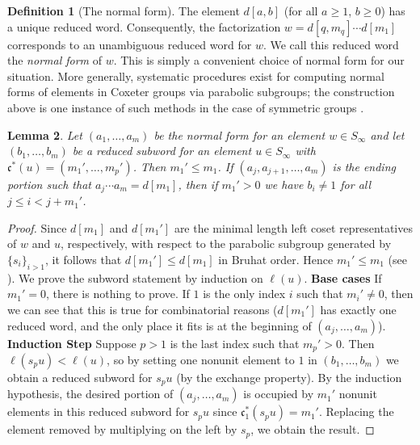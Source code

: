 \documentclass[reqno]{amsart}
\newtheorem{lemma}{Lemma}[subsection]
\theoremstyle{definition}
\newtheorem{definition}[lemma]{Definition}
\theoremstyle{remark}
\numberwithin{equation}{subsection}
\newcommand{\code}{\mathfrak{c}}
\begin{document}
\begin{definition}[The normal form]
The element $d[a,b]$ (for all $a\geq 1$, $b\geq 0$) has a unique reduced word. Consequently, the factorization $w=d[q,m_q]\cdots d[m_1]$ corresponds to an unambiguous reduced word for $w$. We call this reduced word the \emph{normal form} of $w$. This is simply a convenient choice of normal form for our situation. More generally, systematic procedures exist for computing normal forms of elements in Coxeter groups via parabolic subgroups; the construction above is one instance of such methods in the case of symmetric groups \cite{combcox}.
\end{definition}

\begin{lemma} \label{lemma:subword}
Let $(a_1,\ldots,a_m)$ be the normal form for an element $w\in S_\infty$ and let $(b_1,\ldots,b_m)$ be a reduced subword for an element $u\in S_\infty$ with $\code^*(u)=(m_1',\ldots,m_p')$. Then $m_1'\leq m_1$. If $(a_j,a_{j+1},\ldots,a_m)$ is the ending portion such that $a_j\cdots a_m=d[m_1]$, then if $m_1'>0$ we have $b_i\neq 1$ for all $j\leq i<j+m_1'$.
\end{lemma}
\begin{proof}
Since $d[m_1]$ and $d[m_1']$ are the minimal length left coset representatives of $w$ and $u$, respectively, with respect to the parabolic subgroup generated by $\{s_i\}_{i>1}$, it follows that $d[m_1']\leq d[m_1]$ in Bruhat order. Hence $m_1'\leq m_1$ (see \cite{combcox}). We prove the subword statement by induction on $\ell(u)$. 
\textbf{Base cases}
If $m_1'=0$, there is nothing to prove. 
If $1$ is the only index $i$ such that $m_i'\neq 0$, then we can see that this is true for combinatorial reasons ($d[m_1']$ has exactly one reduced word, and the only place it fits is at the beginning of $(a_j,\ldots,a_m)$). 
\textbf{Induction Step}
Suppose $p>1$ is the last index such that $m_p'>0$. Then $\ell(s_pu)<\ell(u)$, so by setting one nonunit element to $1$ in $(b_1,\ldots,b_m)$ we obtain a reduced subword for $s_pu$ (by the exchange property). By the induction hypothesis, the desired portion of $(a_j,\ldots,a_m)$ is occupied by $m_1'$ nonunit elements in this reduced subword for $s_pu$ since $\code_1^*(s_pu)=m_1'$. Replacing the element removed by multiplying on the left by $s_p$, we obtain the result.
\end{proof}
\end{document}
